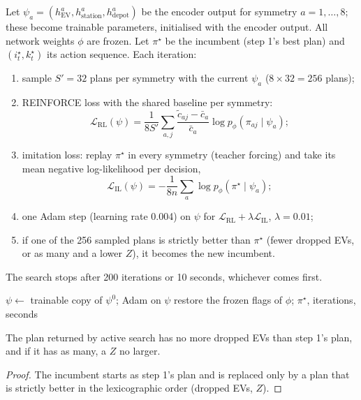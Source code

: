 Let $\psi_a=(h^{a}_{\text{EV}},h^{a}_{\text{station}},h^{a}_{\text{depot}})$ be the encoder output for symmetry $a=1,\dots,8$; these become trainable parameters, initialised with the encoder output. All network weights $\phi$ are frozen. Let $\pi^\star$ be the incumbent (step 1's best plan) and $(i^\star_t,k^\star_t)$ its action sequence. Each iteration:
\begin{enumerate}
  \item sample $S'=32$ plans per symmetry with the current $\psi_a$ ($8\times32=256$ plans);
  \item REINFORCE loss with the shared baseline per symmetry:
  \[
  \mathcal L_{\text{RL}}(\psi)=\frac{1}{8S'}\sum_{a,j}\frac{\tilde c_{aj}-\bar c_a}{\bar c_a}\log p_\phi(\pi_{aj}\mid\psi_a);
  \]
  \item imitation loss: replay $\pi^\star$ in every symmetry (teacher forcing) and take its mean negative log-likelihood per decision,
  \[
  \mathcal L_{\text{IL}}(\psi)=-\frac{1}{8n}\sum_{a}\log p_\phi(\pi^\star\mid\psi_a);
  \]
  \item one Adam step (learning rate 0.004) on $\psi$ for $\mathcal L_{\text{RL}}+\lambda\mathcal L_{\text{IL}}$, $\lambda=0.01$;
  \item if one of the 256 sampled plans is strictly better than $\pi^\star$ (fewer dropped EVs, or as many and a lower $Z$), it becomes the new incumbent.
\end{enumerate}
The search stops after 200 iterations or 10 seconds, whichever comes first.

\begin{algorithm}[H]
\caption{Efficient Active Search for one instance ()}
\DontPrintSemicolon
{}
$\psi\leftarrow$ trainable copy of $\psi^{0}$; Adam on $\psi$\;
restore the frozen flags of $\phi$; \Return $\pi^\star$, iterations, seconds\;
\end{algorithm}

\begin{proposition}
The plan returned by active search has no more dropped EVs than step 1's plan, and if it has as many, a $Z$ no larger.
\end{proposition}
\begin{proof}
The incumbent starts as step 1's plan and is replaced only by a plan that is strictly better in the lexicographic order (dropped EVs, $Z$).
\end{proof}

